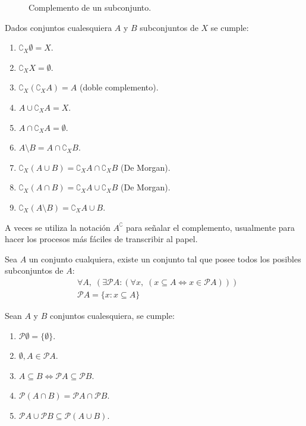 \documentclass[11pt,oneside,a4paper]{book}
\renewcommand{\P}{\mathcal{P}}
\begin{document}
\begin{figure}
\centering
{}
\caption{Complemento de un subconjunto.}
\end{figure}

\begin{prop}
Dados conjuntos cualesquiera $A$ y $B$ subconjuntos de $X$ se cumple:
\begin{enumerate}
\item $\complement_X \emptyset=X$.
\item $\complement_X X=\emptyset$.
\item $\complement_X(\complement_X A)=A$ (doble complemento).
\item $A\cup \complement_X A=X$.
\item $A\cap \complement_X A=\emptyset$.
\item $A\setminus B=A\cap\complement_X B$.
\item $\complement_X(A\cup B)=\complement_X A\cap\complement_X B$ (De Morgan).
\item $\complement_X(A\cap B)=\complement_X A\cup\complement_X B$ (De Morgan).
\item $\complement_X(A\setminus B)=\complement_X A\cup B$.
\end{enumerate}
\end{prop}
A veces se utiliza la notación $A^\complement$ para señalar el complemento, usualmente para hacer los procesos más fáciles de transcribir al papel.
\begin{axiom}
Sea $A$ un conjunto cualquiera, existe un conjunto tal que posee todos los posibles subconjuntos de $A$:
$$
\begin{aligned}
&\forall A,\;(\exists \P A:(\forall x,\;(x\subseteq A\iff x\in \P A)))\\
&\P A=\{x:x\subseteq A\}
\end{aligned}
$$
\end{axiom}

\begin{prop}
Sean $A$ y $B$ conjuntos cualesquiera, se cumple:
\begin{enumerate}
\item $\P\emptyset=\{\emptyset\}$.
\item $\emptyset,A\in\P A$.
\item $A\subseteq B\iff\P A\subseteq\P B$.
\item $\P(A\cap B)=\P A\cap\P B$.
\item $\P A\cup\P B\subseteq\P(A\cup B)$.
\end{enumerate}
\end{prop}
\end{document}
